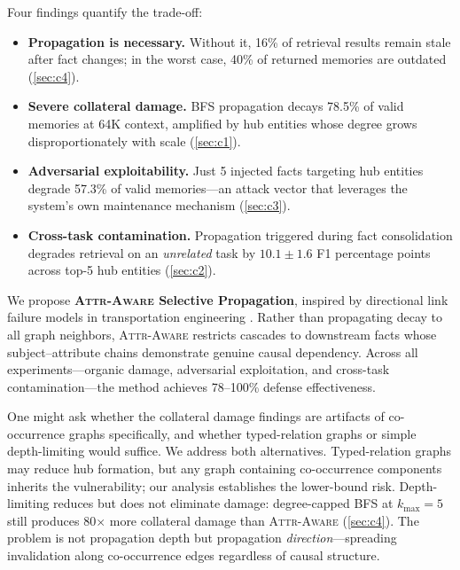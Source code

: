 \documentclass[11pt]{article}
\newcommand{\attraware}{\textsc{Attr-Aware}}
\begin{document}
Four findings quantify the trade-off:

\begin{itemize}
  \item \textbf{Propagation is necessary.} Without it, 16\% of retrieval results remain stale after fact changes; in the worst case, 40\% of returned memories are outdated (\cref{sec:c4}).

  \item \textbf{Severe collateral damage.} BFS propagation decays 78.5\% of valid memories at 64K context, amplified by hub entities whose degree grows disproportionately with scale (\cref{sec:c1}).

  \item \textbf{Adversarial exploitability.} Just 5 injected facts targeting hub entities degrade 57.3\% of valid memories---an attack vector that leverages the system's own maintenance mechanism (\cref{sec:c3}).

  \item \textbf{Cross-task contamination.} Propagation triggered during fact consolidation degrades retrieval on an \textit{unrelated} task by $10.1\pm1.6$ F1 percentage points across top-5 hub entities (\cref{sec:c2}).
\end{itemize}

We propose \textbf{\attraware{} Selective Propagation}, inspired by directional link failure models in transportation engineering \citep{chen_network_2007}.
Rather than propagating decay to all graph neighbors, \attraware{} restricts cascades to downstream facts whose subject--attribute chains demonstrate genuine causal dependency.
Across all experiments---organic damage, adversarial exploitation, and cross-task contamination---the method achieves 78--100\% defense effectiveness.

One might ask whether the collateral damage findings are artifacts of co-occurrence graphs specifically, and whether typed-relation graphs \citep{magma_2026} or simple depth-limiting would suffice.
We address both alternatives.
Typed-relation graphs may reduce hub formation, but any graph containing co-occurrence components inherits the vulnerability; our analysis establishes the lower-bound risk.
Depth-limiting reduces but does not eliminate damage: degree-capped BFS at $k_{\max}=5$ still produces 80$\times$ more collateral damage than \attraware{} (\cref{sec:c4}).
The problem is not propagation depth but propagation \textit{direction}---spreading invalidation along co-occurrence edges regardless of causal structure.
\end{document}
